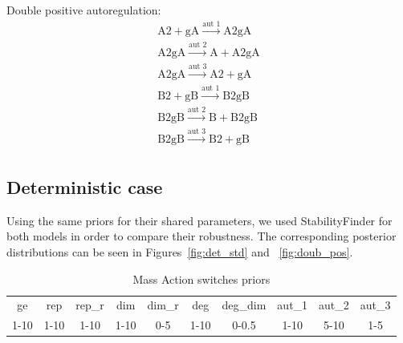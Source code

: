 Double positive autoregulation:
$$
\begin{array}{cccc} 
    \textrm{A2} + \textrm{gA} \stackrel{\textrm{aut 1}}{\longrightarrow} \textrm{A2gA} \\
    \textrm{A2gA} \stackrel{\textrm{aut 2}}{\longrightarrow} \textrm{A} + \textrm{A2gA}\\
    \textrm{A2gA} \stackrel{\textrm{aut 3}}{\longrightarrow} \textrm{A2}+ \textrm{gA}  \\
    \textrm{B2} + \textrm{gB} \stackrel{\textrm{aut 1}}{\longrightarrow} \textrm{B2gB} \\
    \textrm{B2gB} \stackrel{\textrm{aut 2}}{\longrightarrow} \textrm{B} + \textrm{B2gB}\\
    \textrm{B2gB} \stackrel{\textrm{aut 3}}{\longrightarrow} \textrm{B2}+ \textrm{gB}  \\
\end{array}
$$

\subsection{Deterministic case}
Using the same priors for their shared parameters, we used StabilityFinder for both models in order to compare their robustness. The corresponding posterior distributions can be seen in Figures~\ref{fig:det_std} and ~\ref{fig:doub_pos}.

\begin{table}[p]
\centering
\caption{Mass Action switches priors}
\label{tab:simp}
\begin{tabular}{cccccccccc}
ge   & rep  & rep\_r & dim  & dim\_r & deg & deg\_dim & aut\_1 & aut\_2 & aut\_3\\
1-10 & 1-10 & 1-10    & 1-10 & 0-5    & 1-10 & 0-0.5   &1-10&5-10&1-5
\end{tabular}
\end{table}



